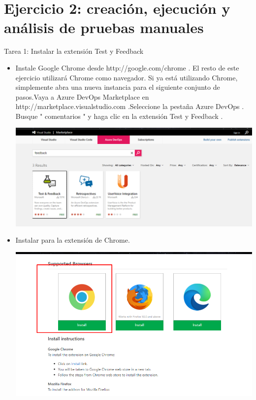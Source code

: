 \section{Ejercicio 2: creación, ejecución y análisis de pruebas manuales } 
Tarea 1: Instalar la extensión Test y  Feedback
\begin{itemize}

\item Instale Google Chrome desde http://google.com/chrome . El resto de este ejercicio utilizará Chrome como navegador. Si ya está utilizando Chrome, simplemente abra una nueva instancia para el siguiente conjunto de pasos.Vaya a Azure DevOps Marketplace en http://marketplace.visualstudio.com .Seleccione la pestaña Azure DevOps . Busque " comentarios " y haga clic en la extensión Test y Feedback .
\begin{center}
\includegraphics[width=\columnwidth]{images/20}\newline
\end{center} 
\item Instalar para la extensión de Chrome.
\begin{center}
\includegraphics[width=\columnwidth]{images/21}\newline
\end{center} 

\end{itemize}
